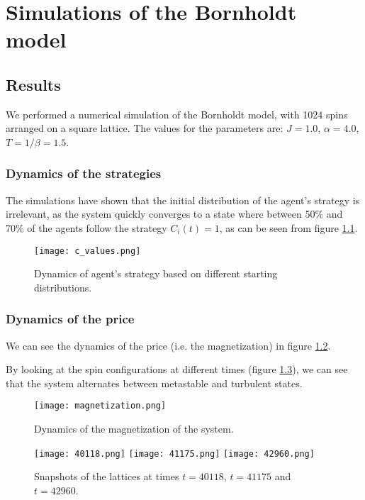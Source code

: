 \chapter{Simulations of the Bornholdt model}\label{ch:simulations}
\section{Results}
We performed a numerical simulation of the Bornholdt model, with 1024 spins arranged on a square lattice. The values for the parameters are: $J=1.0$, $\alpha=4.0$, $T=1/\beta=1.5$. 
\subsection{Dynamics of the strategies}
The simulations have shown that the initial distribution of the agent's strategy is irrelevant, as the system quickly converges to a state where between 50\% and 70\% of the agents follow the strategy $C_i(t) = 1$, as can be seen from figure \ref{fig:strategies}.

\begin{figure}[H]
    \centering
    \texttt{[image: c\_values.png]}
    \caption{Dynamics of agent's strategy based on different starting distributions.}
    \label{fig:strategies}
\end{figure}

\subsection{Dynamics of the price}
We can see the dynamics of the price (i.e. the magnetization) in figure \ref{fig:magnetization}.

By looking at the spin configurations at different times (figure \ref{fig:lattices}), we can see that the system alternates between metastable and turbulent states.

\begin{figure}[H]
    \centering
    \texttt{[image: magnetization.png]}
    \caption{Dynamics of the magnetization of the system.}
    \label{fig:magnetization}
\end{figure}

\begin{figure}[H]
    \centering
    \texttt{[image: 40118.png]}
    \texttt{[image: 41175.png]}
    \texttt{[image: 42960.png]}
    \caption{Snapshots of the lattices at times $t=40118$, $t=41175$ and $t=42960$.}
    \label{fig:lattices}
\end{figure}

